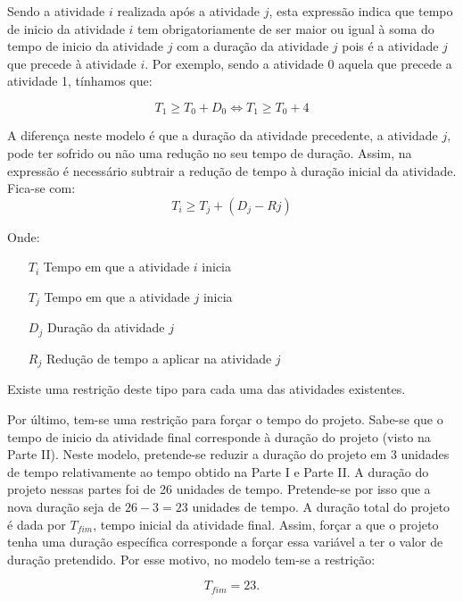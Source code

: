 Sendo a atividade $i$ realizada após a atividade $j$, esta expressão indica que tempo de inicio da atividade $i$ tem obrigatoriamente de
ser maior ou igual à soma do tempo de inicio da atividade $j$ com a duração da
atividade $j$ pois é a atividade $j$ que precede à atividade $i$. Por exemplo,
sendo a atividade 0 aquela que precede a atividade 1, tínhamos que: 

\begin{displaymath} T_1 \ge T_0 + D_0 \Leftrightarrow T_1 \ge T_0
	+ 4 \end{displaymath}

A diferença neste modelo é que a duração da atividade precedente, a atividade $j$, pode ter sofrido
ou não uma redução no seu tempo de duração. Assim, na expressão é necessário subtrair a redução de tempo à duração inicial da atividade. Fica-se com:
\begin{displaymath}
T_{i} \ge T_{j} + (D_{j} - R{j})
\end{displaymath}

Onde:

\begin{itemize}
	\item[$T_{i}$] Tempo em que a atividade $i$ inicia
	\item[$T_{j}$] Tempo em que a atividade $j$ inicia
	\item[$D_{j}$] Duração da atividade $j$
	\item[$R_{j}$] Redução de tempo a aplicar na atividade $j$
\end{itemize}

Existe uma restrição deste tipo para cada uma das atividades existentes. 

Por último, tem-se uma restrição para forçar o tempo do projeto. Sabe-se que o tempo de inicio da atividade final corresponde à duração do projeto (visto na Parte II). Neste modelo, pretende-se reduzir a duração do projeto em 3 unidades de tempo relativamente ao tempo obtido na Parte I e Parte II. A duração do projeto nessas partes foi de 26 unidades de tempo. Pretende-se por isso que a nova duração seja de $26-3=23$ unidades de tempo. A duração total do projeto é dada por $T_{fim}$, tempo inicial da atividade final. Assim, forçar a que o projeto tenha uma duração específica corresponde a forçar essa variável a ter o valor de duração pretendido. Por esse motivo, no modelo tem-se a restrição:

\begin{displaymath}
T_{fim} = 23.
\end{displaymath}

